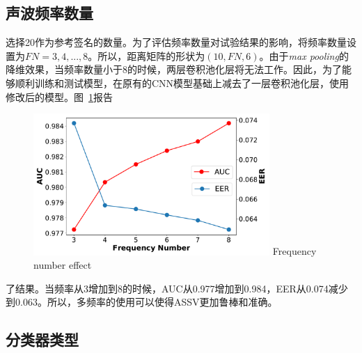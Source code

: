 \subsection{声波频率数量}
选择20作为参考签名的数量。为了评估频率数量对试验结果的影响，将频率数量设置为$FN=3, 4,..., 8$。所以，距离矩阵的形状为$(10, FN, 6)$。由于\textit{max pooling}的降维效果，当频率数量小于8的时候，两层卷积池化层将无法工作。因此，为了能够顺利训练和测试模型，在原有的CNN模型基础上减去了一层卷积池化层，使用修改后的模型。图~\ref{fig:frequency-number}报告
\begin{figure}
  \centering
  \includegraphics[width=0.8\textwidth]{figure/multi_frequency_auc_eer.pdf}
      {Frequency number effect}
  \label{fig:frequency-number}
\end{figure}
了结果。当频率从3增加到8的时候，AUC从0.977增加到0.984，EER从0.074减少到0.063。所以，多频率的使用可以使得ASSV更加鲁棒和准确。

\subsection{分类器类型}


